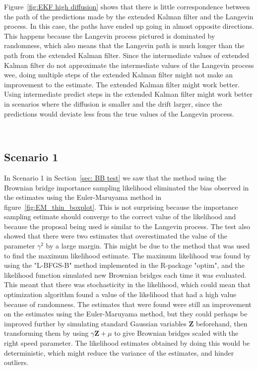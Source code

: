 Figure~\ref{fig:EKF high diffusion} shows that there is little correspondence between the path of the predictions made by the extended Kalman filter and the Langevin process. In this case, the paths have ended up going in almost opposite directions. This happens because the Langevin process pictured is dominated by randomness, which also means that the Langevin path is much longer than the path from the extended Kalman filter. Since the intermediate values of extended Kalman filter do not approximate the intermediate values of the Langevin process wee, doing multiple steps of the extended Kalman filter might not make an improvement to the estimate.
The extended Kalman filter might work better. Using intermediate predict steps in the extended Kalman filter might work better in scenarios where the diffusion is smaller and the drift larger, since the predictions would deviate less from the true values of the Langevin process.

\


\subsection{Scenario 1}
\label{subsec: Scenario 1 interpretation}
In Scenario 1 in Section~\ref{sec: BB test} we saw that the method using the Brownian bridge importance sampling likelihood eliminated the bias observed in the estimates using the Euler-Maruyama method in figure~\ref{fig:EM_thin_boxplot}. This is not surprising because the importance sampling estimate should converge to the correct value of the likelihood and because the proposal being used is similar to the Langevin process. The test also showed that there were two estimates that overestimated the value of the parameter $\gamma^2$ by a large margin. This might be due to the method that was used to find the maximum likelihood estimate. The maximum likelihood was found by using the "L-BFGS-B" method implemented in the R-package "optim", and the likelihood function simulated new Brownian bridges each time it was evaluated. This meant that there was stochasticity in the likelihood, which could mean that optimization algorithm found a value of the likelihood that had a high value because of randomness. The estimates that were found were still an improvement on the estimates using the Euler-Maruyama method, but they could perhaps be improved further by simulating standard Gaussian variables $\textbf{Z}$ beforehand, then transforming them by using $\gamma \textbf{Z} +\mu$ to give Brownian bridges scaled with the right speed parameter. The likelihood estimates obtained by doing this would be deterministic, which might reduce the variance of the estimates, and hinder outliers.

